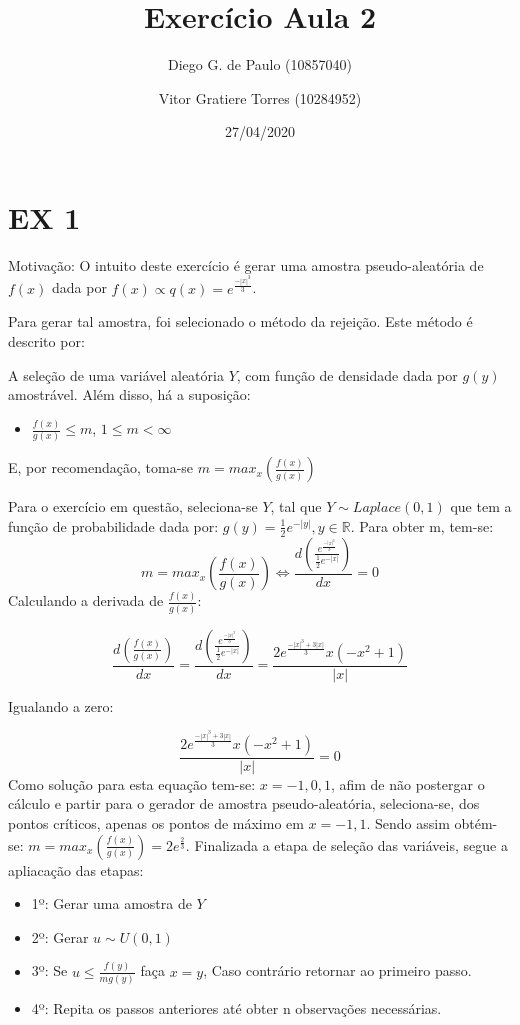 \documentclass[11pt,]{article}
\title{Exercício Aula 2}
\author{Diego G. de Paulo (10857040) \and Vitor Gratiere Torres (10284952)}
\date{27/04/2020}
\providecommand{\tightlist}{%
  \setlength{\itemsep}{0pt}\setlength{\parskip}{0pt}}
\begin{document}
\maketitle

\hypertarget{ex-1}{%
\section{EX 1}\label{ex-1}}

Motivação: O intuito deste exercício é gerar uma amostra
pseudo-aleatória de \(f(x)\) dada por
\(f(x) \propto q(x) = e^{\frac{-|x|^3}{3}}\).

Para gerar tal amostra, foi selecionado o método da rejeição. Este
método é descrito por:

A seleção de uma variável aleatória \(Y\), com função de densidade dada
por \(g(y)\) amostrável. Além disso, há a suposição:

\begin{itemize}
\tightlist
\item
  \(\frac{f(x)}{g(x)} \leq m\), \(1 \leq m < \infty\)
\end{itemize}

E, por recomendação, toma-se
\(m = max_x\left( \frac{f(x)}{g(x)} \right)\)

Para o exercício em questão, seleciona-se \(Y\), tal que
\(Y \sim Laplace(0,1)\) que tem a função de probabilidade dada por:
\(g(y) = \frac{1}{2} e^{-|y|}, y \in \mathbb{R}\). Para obter m, tem-se:
\[m = max_x\left( \frac{f(x)}{g(x)} \right) \iff \frac{d\left(\frac{e^{\frac{-|x|^3}{3}}}{\frac{1}{2} e^{-|x|}}  \right)}{dx} = 0\]
Calculando a derivada de \(\frac{f(x)}{g(x)}\):

\[
\frac{d\left(\frac{f(x)}{g(x)}
\right)}{dx} =
\frac{d\left(\frac{e^{\frac{-|x|^3}{3}}}{\frac{1}{2} e^{-|x|}}  \right)}{dx} =
\frac{2e^{\frac{-|x|^3+3|x|}{3}}x(-x^2+1)}{|x|}
\]

Igualando a zero:

\[\frac{2e^{\frac{-|x|^3+3|x|}{3}}x(-x^2+1)}{|x|} = 0\] Como solução
para esta equação tem-se: \(x = -1, 0, 1\), afim de não postergar o
cálculo e partir para o gerador de amostra pseudo-aleatória,
seleciona-se, dos pontos críticos, apenas os pontos de máximo em
\(x = -1, 1\). Sendo assim obtém-se:
\(m = max_x\left( \frac{f(x)}{g(x)} \right) = 2e^{\frac{2}{3}}\).
Finalizada a etapa de seleção das variáveis, segue a apliacação das
etapas:

\begin{itemize}
\tightlist
\item
  1º: Gerar uma amostra de \(Y\)
\item
  2º: Gerar \(u \sim U(0,1)\)
\item
  3º: Se \(u \leq \frac{f(y)}{mg(y)}\) faça \(x = y\), Caso contrário
  retornar ao primeiro passo.
\item
  4º: Repita os passos anteriores até obter n observações necessárias.
\end{itemize}
\end{document}
